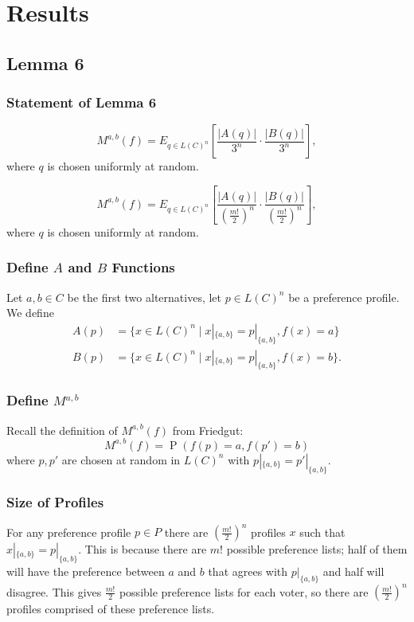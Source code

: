 \documentclass[aspectratio=169]{beamer}
\DeclareMathOperator{\probability}{P}
\begin{document}
	\section{Results}
	\subsection{Lemma 6}

		\begin{frame}
			\frametitle{Statement of Lemma 6}

			\begin{lemma}
				\[
					M^{a,b}(f) = E_{q \in L(C)^n} \left[ \frac{|A(q)|}{3^n} \cdot \frac{|B(q)|}{3^n} \right],
				\]
				where $q$ is chosen uniformly at random.
			\end{lemma}

			\begin{lemma}
				\[
					M^{a,b}(f) = E_{q \in L(C)^n} \left[ \frac{|A(q)|}{\left(\frac{m!}{2}\right)^n} \cdot \frac{|B(q)|}{\left(\frac{m!}{2}\right)^n} \right],
				\]
				where $q$ is chosen uniformly at random.
			\end{lemma}
		\end{frame}

		\begin{frame}
			\frametitle{Define $A$ and $B$ Functions}

			Let $a, b \in C$ be the first two alternatives, let $p \in L(C)^n$ be a preference profile. We define
			\begin{align*}
				A(p) &= \{x \in L(C)^n \mid x|_{\{a,b\}} = p|_{\{a,b\}}, f(x) = a\} \\
				B(p) &= \{x \in L(C)^n \mid x|_{\{a,b\}} = p|_{\{a,b\}}, f(x) = b\}.
			\end{align*}
		\end{frame}

		\begin{frame}
			\frametitle{Define $M^{a,b}$}

			Recall the definition of $M^{a,b}(f)$ from Friedgut:
			\[
				M^{a,b}(f) = \probability(f(p) = a, f(p') = b)
			\]
			where $p, p'$ are chosen at random in $L(C)^n$ with $p|_{\{a,b\}} = p'|_{\{a,b\}}$.
		\end{frame}

		\begin{frame}
			\frametitle{Size of Profiles}

			For any preference profile $p \in P$ there are $(\frac{m!}{2})^n$ profiles $x$ such that $x|_{\{a, b\}} = p|_{\{a, b\}}$. This is because there are $m!$ possible preference lists; half of them will have the preference between $a$ and $b$ that agrees with $p|_{\{a, b\}}$ and half will disagree. This gives $\frac{m!}{2}$ possible preference lists for each voter, so there are $(\frac{m!}{2})^n$ profiles comprised of these preference lists.
		\end{frame}
\end{document}
